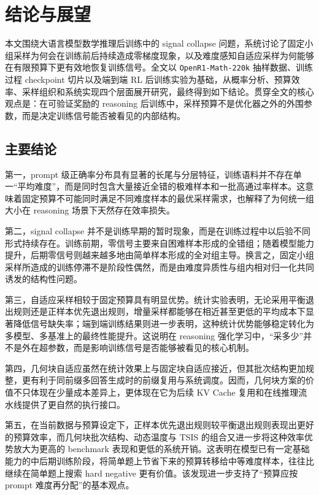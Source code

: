 \chapter{结论与展望}\label{chap:conclusion}

本文围绕大语言模型数学推理后训练中的 signal collapse 问题，系统讨论了固定小组采样为何会在训练前后持续造成零梯度现象，以及难度感知自适应采样为何能够在有限预算下更有效地恢复训练信号。全文以 \texttt{OpenR1-Math-220k} 抽样数据、训练过程 checkpoint 切片以及端到端 RL 后训练实验为基础，从概率分析、预算效率、采样组织和系统实现四个层面展开研究，最终得到如下结论。贯穿全文的核心观点是：在可验证奖励的 reasoning 后训练中，采样预算不是优化器之外的外围参数，而是决定训练信号能否被看见的内部结构。

\section{主要结论}

第一，prompt 级正确率分布具有显著的长尾与分层特征，训练语料并不存在单一“平均难度”，而是同时包含大量接近全错的极难样本和一批高通过率样本。这意味着固定预算不可能同时满足不同难度样本的最优采样需求，也解释了为何统一组大小在 reasoning 场景下天然存在效率损失。

第二，signal collapse 并不是训练早期的暂时现象，而是在训练过程中以后验不同形式持续存在。训练前期，零信号主要来自困难样本形成的全错组；随着模型能力提升，后期零信号则越来越多地由简单样本形成的全对组主导。换言之，固定小组采样所造成的训练停滞不是阶段性偶然，而是由难度异质性与组内相对归一化共同诱发的结构性问题。

第三，自适应采样相较于固定预算具有明显优势。统计实验表明，无论采用平衡退出规则还是正样本优先退出规则，增量采样都能够在相近甚至更低的平均成本下显著降低信号缺失率；端到端训练结果则进一步表明，这种统计优势能够稳定转化为多模型、多基准上的最终性能提升。这说明在 reasoning 强化学习中，“采多少”并不是外在超参数，而是影响训练信号是否能够被看见的核心机制。

第四，几何块自适应虽然在统计效果上与固定块自适应接近，但其批次结构更加规整，更有利于同前缀多回答生成时的前缀复用与系统调度。因而，几何块方案的价值不只体现在少量成本差异上，更体现在它为后续 KV Cache 复用和在线推理流水线提供了更自然的执行接口。

第五，在当前数据与预算设定下，正样本优先退出规则较平衡退出规则表现出更好的预算效率，而几何块批次结构、动态温度与 TSIS 的组合又进一步将这种效率优势放大为更高的 benchmark 表现和更低的系统开销。这表明在模型已有一定基础能力的中后期训练阶段，将简单题上节省下来的预算转移给中等难度样本，往往比继续在简单题上搜索 hard negative 更有价值。该发现进一步支持了“预算应按 prompt 难度再分配”的基本观点。

